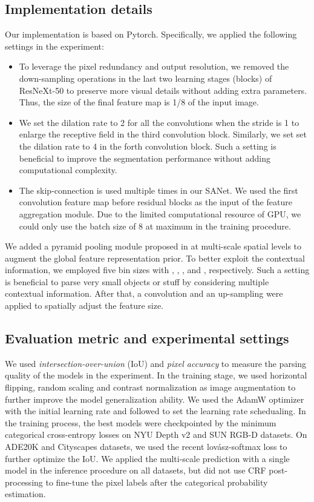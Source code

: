 \documentclass[10pt,twocolumn,twoside]{IEEEtran}
\begin{document}
\subsection{Implementation details}

Our implementation is based on Pytorch. Specifically, we applied the following settings in the experiment: 
\begin{itemize}
    \item To leverage the pixel redundancy and output resolution, we removed the down-sampling operations in the last two learning stages (blocks) of ResNeXt-50 to preserve more visual details without adding extra parameters. Thus, the size of the final feature map is 1/8 of the input image.
    \item We set the dilation rate to 2 for all the  convolutions when the stride is 1 to enlarge the receptive field in the third convolution block. Similarly, we set set the dilation rate to 4 in the forth convolution block. Such a setting is beneficial to improve the segmentation performance without adding computational complexity.
    \item The skip-connection is used multiple times in our SANet. We used the first convolution feature map before residual blocks as the input of the feature aggregation module. Due to the limited computational resource of GPU, we could only use the batch size of 8 at maximum in the training procedure. \end{itemize}
We added a pyramid pooling module proposed in \cite{CVPR17:PSPNET} at multi-scale spatial levels to augment the global feature representation prior. To better exploit the contextual information, we employed five bin sizes with , , ,  and , respectively. Such a setting is beneficial to parse very small objects or stuff by considering multiple contextual information. After that, a  convolution and an up-sampling were applied to spatially adjust the feature size. 


\subsection{Evaluation metric and experimental settings}

We used {\em intersection-over-union} (IoU) and {\em pixel accuracy} to measure the parsing quality of the models in the experiment. In the training stage, we used horizontal flipping, random scaling and contrast normalization as image augmentation to further improve the model generalization ability. We used the AdamW \cite{ICLR19:ADAMW} optimizer with the initial learning rate  and followed \cite{TPAMI:DEEPLAB} to set the learning rate schedualing. In the training process, the best models were checkpointed by the minimum categorical cross-entropy losses on NYU Depth v2 and SUN RGB-D datasets. On ADE20K and Cityscapes datasets, we used the recent lov{\'a}sz-softmax loss \cite{CVPR18:LOVAZ_LOSS} to further optimize the IoU. We applied the multi-scale prediction with a single model in the inference procedure on all datasets, but did not use CRF post-processing \cite{TPAMI:DEEPLAB} to fine-tune the pixel labels after the categorical probability estimation.
\end{document}
